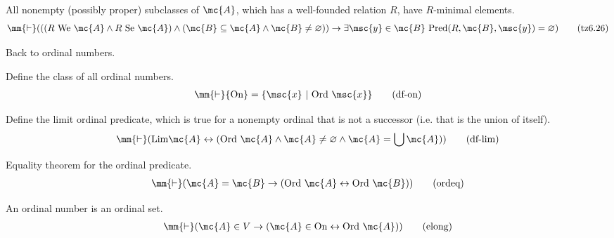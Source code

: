 \begin{lemma} All nonempty (possibly proper) subclasses of
$\mc{A}$, which has a
       well-founded relation $R$, have $R$-minimal elements. 
\begin{align}
\mm{\vdash} ( ( ( R~{\rm We}~\mc{A} \wedge R~{\rm Se}~\mc{A} ) \wedge ( \mc{B}
    \subseteq \mc{A} \wedge \mc{B} \ne \varnothing ) ) \rightarrow \exists
    \msc{y} \in \mc{B}~{\rm Pred} ( R , \mc{B} , \msc{y} ) = \varnothing
    )\label{eq:tz6.26}\tag{tz6.26}
\end{align}
\end{lemma}


Back to ordinal numbers.

\begin{metadefinition} Define the class of all ordinal numbers. 
\begin{align}
\mm{\vdash} {\rm On} = \{ \msc{x} ~\vert~ {\rm Ord}~ \msc{x}
    \}\label{eq:df-on}\tag{df-on}
\end{align}
\end{metadefinition}


\begin{metadefinition} Define the limit ordinal predicate, which
is true for a nonempty ordinal
     that is not a successor (i.e. that is the union of itself).  
\begin{align}
\mm{\vdash} ( {\rm Lim} \mc{A} \leftrightarrow ( {\rm Ord}~ \mc{A} \wedge \mc{A}
    \ne \varnothing \wedge \mc{A} = \bigcup \mc{A} )
    )\label{eq:df-lim}\tag{df-lim}
\end{align}
\end{metadefinition}


\begin{lemma} Equality theorem for the ordinal predicate. 
\begin{align}
\mm{\vdash} ( \mc{A} = \mc{B} \rightarrow ( {\rm Ord}~ \mc{A} \leftrightarrow
    {\rm Ord}~ \mc{B} ) )\label{eq:ordeq}\tag{ordeq}
\end{align}
\end{lemma}


\begin{lemma} An ordinal number is an ordinal set. 
\begin{align}
\mm{\vdash} ( \mc{A} \in V \rightarrow ( \mc{A} \in {\rm On} \leftrightarrow
    {\rm Ord}~ \mc{A} ) )\label{eq:elong}\tag{elong}
\end{align}
\end{lemma}


